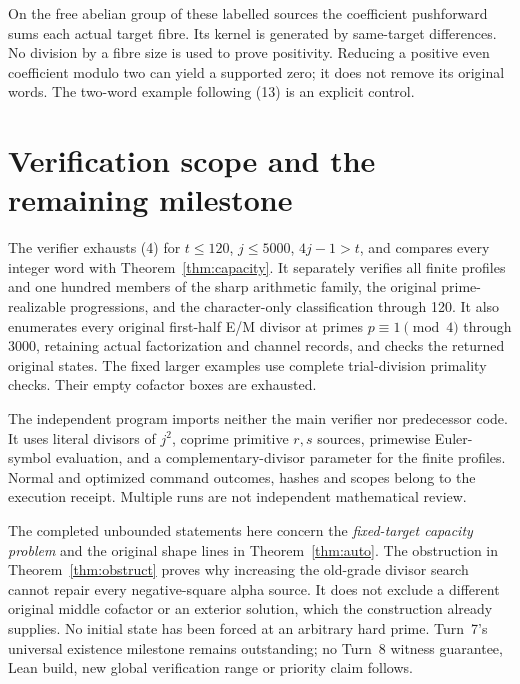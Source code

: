 On the free abelian group of these labelled sources the coefficient pushforward
sums each actual target fibre. Its kernel is generated by same-target differences.
No division by a fibre size is used to prove positivity. Reducing a positive even
coefficient modulo two can yield a supported zero; it does not remove its
original words. The two-word example following (13) is an explicit control.

\section{Verification scope and the remaining milestone}
The verifier exhausts (4) for $t\le120$, $j\le5000$, $4j-1>t$, and compares every
integer word with Theorem~\ref{thm:capacity}. It separately verifies all finite
profiles and one hundred members of the sharp arithmetic family, the original
prime-realizable progressions, and the character-only classification through 120.
It also enumerates every original first-half E/M divisor at primes
$p\equiv1\pmod4$ through 3000, retaining actual factorization and channel records,
and checks the returned original states. The fixed larger examples use complete
trial-division primality checks. Their empty cofactor boxes are exhausted.

The independent program imports neither the main verifier nor predecessor code.
It uses literal divisors of $j^2$, coprime primitive $r,s$ sources, primewise
Euler-symbol evaluation, and a complementary-divisor parameter for the finite
profiles. Normal and optimized command outcomes, hashes and scopes belong to the
execution receipt. Multiple runs are not independent mathematical review.

The completed unbounded statements here concern the \emph{fixed-target capacity
problem} and the original shape lines in Theorem~\ref{thm:auto}. The obstruction
in Theorem~\ref{thm:obstruct} proves why increasing the old-grade divisor search
cannot repair every negative-square alpha source. It does not exclude a different
original middle cofactor or an exterior solution, which the construction already
supplies. No initial state has been forced at an arbitrary hard prime. Turn~7's
universal existence milestone remains outstanding; no Turn~8 witness guarantee,
Lean build, new global verification range or priority claim follows.
